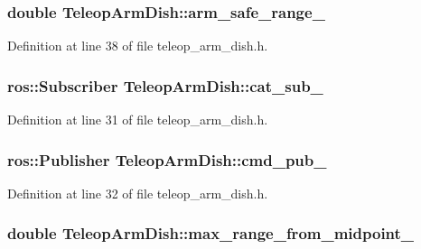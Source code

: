 \subsubsection[{arm\-\_\-safe\-\_\-range\-\_\-}]{\setlength{\rightskip}{0pt plus 5cm}double {\bf \-Teleop\-Arm\-Dish\-::arm\-\_\-safe\-\_\-range\-\_\-}\hspace{0.3cm}{\ttfamily  [private]}}\label{classTeleopArmDish_a0c39d457f5123e8b3bf220738fd29f81}


\-Definition at line 38 of file teleop\-\_\-arm\-\_\-dish.\-h.

\subsubsection[{cat\-\_\-sub\-\_\-}]{\setlength{\rightskip}{0pt plus 5cm}ros\-::\-Subscriber {\bf \-Teleop\-Arm\-Dish\-::cat\-\_\-sub\-\_\-}\hspace{0.3cm}{\ttfamily  [private]}}\label{classTeleopArmDish_a0a8a24a61ff226a3c6cbedcc54eed9d8}


\-Definition at line 31 of file teleop\-\_\-arm\-\_\-dish.\-h.

\subsubsection[{cmd\-\_\-pub\-\_\-}]{\setlength{\rightskip}{0pt plus 5cm}ros\-::\-Publisher {\bf \-Teleop\-Arm\-Dish\-::cmd\-\_\-pub\-\_\-}\hspace{0.3cm}{\ttfamily  [private]}}\label{classTeleopArmDish_abe8f7637a1a628febfd0bef45563be83}


\-Definition at line 32 of file teleop\-\_\-arm\-\_\-dish.\-h.

\subsubsection[{max\-\_\-range\-\_\-from\-\_\-midpoint\-\_\-}]{\setlength{\rightskip}{0pt plus 5cm}double {\bf \-Teleop\-Arm\-Dish\-::max\-\_\-range\-\_\-from\-\_\-midpoint\-\_\-}\hspace{0.3cm}{\ttfamily  [private]}}\label{classTeleopArmDish_a66e51dfe113d9dcbe90c93019cbc369c}


